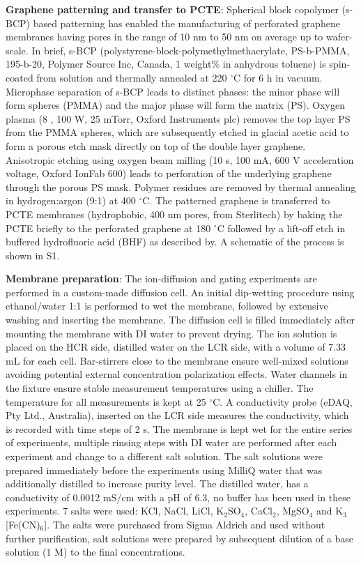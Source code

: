 \vspace{1em}
\noindent
\textbf{Graphene patterning and transfer to PCTE}: Spherical block
copolymer (s-BCP) based patterning has enabled the manufacturing of
perforated graphene membranes having pores in the range of 10 nm to 50
nm on average up to wafer-scale\cite{Choi_2018}. In brief, s-BCP
(polystyrene-block-polymethylmethacrylate, PS-b-PMMA, 195-b-20,
Polymer Source Inc, Canada, 1 weight\% in anhydrous toluene) is
spin-coated from solution and thermally annealed at 220 $^{\circ}$C
for 6 h in vacuum. Microphase separation of s-BCP leads to distinct
phases: the minor phase will form spheres (PMMA) and the major phase
will form the matrix (PS). Oxygen plasma (8 , 100 W, 25 mTorr, Oxford
Instruments plc) removes the top layer PS from the PMMA spheres, which
are subsequently etched in glacial acetic acid to form a porous
etch mask directly on top of the double layer graphene. Anisotropic
etching using oxygen beam milling (10 s, 100 mA, 600 V acceleration
voltage, Oxford IonFab 600) leads to perforation of the underlying
graphene through the porous PS mask. Polymer residues are removed by
thermal annealing in hydrogen:argon (9:1) at 400 $^{\circ}$C. The
patterned graphene is transferred to PCTE membranes (hydrophobic, 400
nm pores, from Sterlitech) by baking the PCTE briefly to the
perforated graphene at 180 $^{\circ}$C followed by a lift-off etch in
buffered hydrofluoric acid (BHF) as described by\cite{Choi_2018}. A
schematic of the process is shown in \Fig{} S1.

\vspace{1em}
\noindent
\textbf{Membrane preparation}: The ion-diffusion and gating experiments are
performed in a custom-made diffusion cell. An initial dip-wetting
procedure using ethanol/water 1:1 is performed to wet the membrane,
followed by extensive washing and inserting the membrane. The
diffusion cell is filled immediately after mounting the membrane with
DI water to prevent drying. The ion solution is placed on the HCR
side, distilled water on the LCR side, with a volume of 7.33 mL for
each cell. Bar-stirrers close to the membrane ensure well-mixed
solutions avoiding potential external concentration polarization
effects. Water channels in the fixture ensure stable measurement
temperatures using a chiller. The temperature for all measurements is
kept at 25 $^{\circ}$C. A conductivity probe (eDAQ, Pty Ltd.,
Australia), inserted on the LCR side measures the conductivity, which
is recorded with time steps of 2 s. The membrane is kept wet for the
entire series of experiments, multiple rinsing steps with DI water are
performed after each experiment and change to a different salt
solution. The salt solutions were prepared immediately before the
experiments using MilliQ water that was additionally distilled to
increase purity level. The distilled water, has a conductivity of
0.0012 mS/cm with a pH of 6.3, no buffer has been used in these
experiments. 7 salts were used: KCl, NaCl, LiCl, K$_{2}$SO$_{4}$,
CaCl$_{2}$, MgSO$_{4}$ and K$_{3}$[Fe(CN)$_{6}$]. The salts were
purchased from Sigma Aldrich and used without further purification,
salt solutions were prepared by subsequent dilution of a base solution
(1 M) to the final concentrations.

